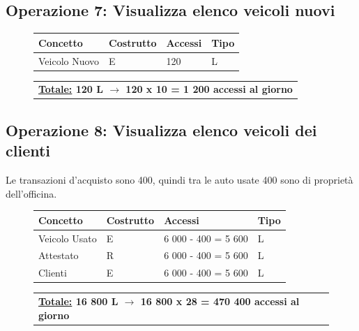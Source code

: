 \documentclass[a4paper,12pt]{report}
\begin{document}
\newpage
\subsection*{Operazione 7: Visualizza elenco veicoli nuovi}
\begin{figure}[H]
	\centering
	\begin{tabular}{L{4.5cm}C{2cm}C{4.5cm}C{2cm}}
		\rule[-2mm]{0mm}{0.6cm}{}
		\textbf{Concetto} & \textbf{Costrutto} &\textbf{Accessi} & \textbf{Tipo} \\
		\hline\rule[-2mm]{0mm}{0.65cm}{}
		Veicolo Nuovo & E & 120 & L \\
	\end{tabular}
	
	\begin{tabular}{C{14.3cm}}
		\rule[-3mm]{0mm}{0.85cm}{}	
		 \textbf{\underline{Totale:} 120 L $\to$ 120 x 10 = 1 200 accessi al giorno}
	\end{tabular}
\end{figure}

\subsection*{Operazione 8: Visualizza elenco veicoli dei clienti}
Le transazioni d'acquisto sono 400, quindi tra le auto usate 400 sono di proprietà dell'officina.
\begin{figure}[H]
	\centering
	\begin{tabular}{L{4.5cm}C{2cm}C{4.5cm}C{2cm}}
		\rule[-2mm]{0mm}{0.6cm}{}
		\textbf{Concetto} & \textbf{Costrutto} &\textbf{Accessi} & \textbf{Tipo} \\
		\hline\rule[-2mm]{0mm}{0.65cm}{}
		Veicolo Usato & E & 6 000 - 400 = 5 600 & L \\
		\hline\rule[-2mm]{0mm}{0.65cm}{}
		Attestato & R & 6 000 - 400 = 5 600 & L \\
		\hline\rule[-2mm]{0mm}{0.65cm}{}
		Clienti & E & 6 000 - 400 = 5 600 & L \\
	\end{tabular}
	
	\begin{tabular}{C{14.3cm}}
		\rule[-3mm]{0mm}{0.85cm}{}	
		 \textbf{\underline{Totale:} 16 800 L $\to$ 16 800 x 28 = 470 400 accessi al giorno}
	\end{tabular}
\end{figure}
\end{document}
